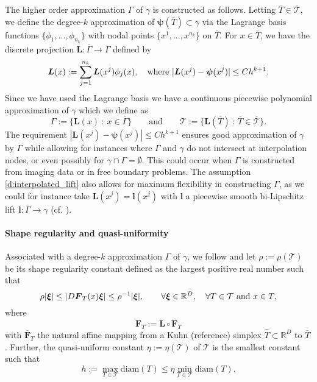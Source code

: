 \documentclass{siamart0516}
\newcommand{\bpsi}{\ensuremath{\boldsymbol \psi}}
\newcommand{\bxi}{\ensuremath{\boldsymbol \xi}}
\newcommand{\bF}{\ensuremath{\boldsymbol F}}
\newcommand{\bl}{\ensuremath{\boldsymbol l}}
\newcommand{\bL}{\ensuremath{\boldsymbol L}}
\numberwithin{equation}{section}
\numberwithin{theorem}{section}
\numberwithin{figure}{section}
\begin{document}
The higher order approximation $\Gamma$ of $\gamma$ is constructed as follows.  
Letting $\overline{T} \in \overline{\mathcal{T}}$, we define the degree-$k$ approximation of $\bpsi (\overline{T}) \subset \gamma$ via the Lagrange basis functions $\{\phi_1,...,\phi_{n_k}\}$ with nodal points $\{x^1,...,x^{n_k}\}$ on $\overline{T}$. For $x\in \overline{T}$, we have the discrete projection $\bL: \overline{\Gamma} \to \Gamma$ defined by
\begin{equation}\label{d:interpolated_lift}
\bL(x) := \sum_{j=1}^{n_k}\bL(x^j)\phi_j(x), ~~ \hbox{ where } |\bL(x^j)-\bpsi(x^j)|  \le C h^{k+1}.
\end{equation}
Since we have used the Lagrange basis we have a continuous piecewise polynomial approximation of $\gamma$ which we define as
\begin{equation}\label{e:degreek}
\Gamma := \{\bL(x)\ : \ x\in \overline{\Gamma}\} \qquad \text{and} \qquad \mathcal T := \{ \bL(\overline T) \ : \ \overline{T} \in \overline{\mathcal T} \}.
\end{equation}
The requirement $|\bL(x^j)-\bpsi(x^j)|  \le C h^{k+1}$ ensures good approximation of $\gamma$ by $\Gamma$ while allowing for instances where $\Gamma$ and $\gamma$ do not intersect at interpolation nodes, or even possibly for $\gamma \cap \Gamma = \emptyset$.  This could occur when $\Gamma$ is constructed from imaging data or in free boundary problems.  The assumption \eqref{d:interpolated_lift} also allows for maximum flexibility in constructing $\Gamma$, as we could for instance take $\bL(x^j)=\bl(x^j)$ with $\bl$ a piecewise smooth bi-Lipschitz lift $\bl: \overline{\Gamma} \rightarrow \gamma$ (cf. \cite{MMN11, BCMN:13, BCMMN16}).  

\paragraph{Shape regularity and quasi-uniformity} Associated with a degree-$k$ approximation $\Gamma$ of $\gamma$, we follow \cite{BP:11} and let $\rho:=\rho(\mathcal T)$ be its  shape regularity constant defined as the largest positive real number such that
$$
\rho | \bxi | \leq |D\bF_T(x) \bxi | \leq \rho^{-1} |\bxi|, \qquad \forall \bxi \in \mathbb R^D, \quad \forall T \in \mathcal T \hbox{ and } x \in T, 
$$
where
\begin{equation}
\bF_T := \bL \circ \overline{\bF}_T
\label{effT}
\end{equation}
with $\overline{\bF}_T$ the natural affine mapping from a Kuhn (reference) simplex $\widehat T \subset \mathbb R^D$ to $\overline{T}$.
Further, the quasi-uniform constant $\eta:=\eta(\mathcal T)$ of $\mathcal T$ is the smallest constant such that 
$$
h:=\max_{T\in \mathcal T} \textrm{diam}(T) \leq \eta \min_{T \in \mathcal T} \textrm{diam}(T).
$$
\end{document}
